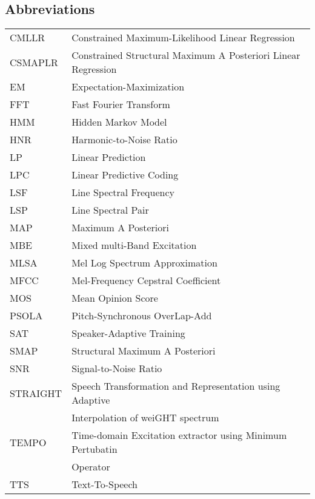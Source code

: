 \documentclass[english,12pt,a4paper,pdftex]{article}
\begin{document}
\subsection*{Abbreviations}
\begin{tabular}{l l}
	CMLLR		& Constrained Maximum-Likelihood Linear Regression\\
	CSMAPLR		& Constrained Structural Maximum A Posteriori Linear Regression\\
	EM 			& Expectation-Maximization\\
	FFT 		& Fast Fourier Transform\\
	HMM			& Hidden Markov Model\\
	HNR			& Harmonic-to-Noise Ratio\\
	LP			& Linear Prediction\\
	LPC 		& Linear Predictive Coding\\
	LSF			& Line Spectral Frequency\\
	LSP			& Line Spectral Pair\\
	MAP			& Maximum A Posteriori\\
	MBE			& Mixed multi-Band Excitation\\
	MLSA		& Mel Log Spectrum Approximation\\
	MFCC		& Mel-Frequency Cepstral Coefficient\\
	MOS			& Mean Opinion Score\\
	PSOLA		& Pitch-Synchronous OverLap-Add\\
	SAT			& Speaker-Adaptive Training\\
	SMAP 		& Structural Maximum A Posteriori\\
	SNR 		& Signal-to-Noise Ratio\\
	STRAIGHT	& Speech Transformation and Representation using Adaptive \\
				& Interpolation of weiGHT spectrum\\
	TEMPO		& Time-domain Excitation extractor using Minimum Pertubatin\\
				& Operator\\
	TTS			& Text-To-Speech
\end{tabular}
\cleardoublepage
\storeinipagenumber
{}
\setcounter{page}{1}







\end{document}
